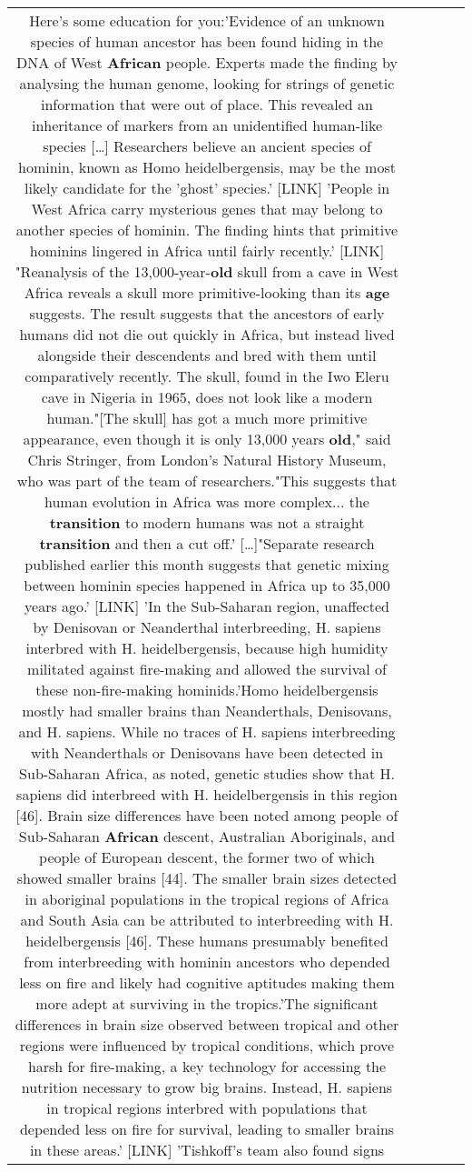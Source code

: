 \documentclass[11pt]{article}
\newlength\mylength
\begin{document}
\begin{center}
\begin{longtable}{|C{.65\mylength}|C{.30\mylength}|C{.12\mylength}|C{.12\mylength}|C{.12\mylength}|}
  \small Here's some education for you:'Evidence of an unknown species of human ancestor has been found hiding in the DNA of West \textbf{African} people. Experts made the finding by analysing the human genome, looking for strings of genetic information that were out of place. This revealed an inheritance of markers from an unidentified human-like species […] Researchers believe an ancient species of hominin, known as Homo heidelbergensis, may be the most likely candidate for the 'ghost' species.' [LINK] 'People in West Africa carry mysterious genes that may belong to another species of hominin. The finding hints that primitive hominins lingered in Africa until fairly recently.' [LINK] "Reanalysis of the 13,000-year-\textbf{old} skull from a cave in West Africa reveals a skull more primitive-looking than its \textbf{age} suggests. The result suggests that the ancestors of early humans did not die out quickly in Africa, but instead lived alongside their descendents and bred with them until comparatively recently. The skull, found in the Iwo Eleru cave in Nigeria in 1965, does not look like a modern human."[The skull] has got a much more primitive appearance, even though it is only 13,000 years \textbf{old}," said Chris Stringer, from London's Natural History Museum, who was part of the team of researchers."This suggests that human evolution in Africa was more complex... the \textbf{transition} to modern humans was not a straight \textbf{transition} and then a cut off.' […]"Separate research published earlier this month suggests that genetic mixing between hominin species happened in Africa up to 35,000 years ago.' [LINK] 'In the Sub-Saharan region, unaffected by Denisovan or Neanderthal interbreeding, H. sapiens interbred with H. heidelbergensis, because high humidity militated against fire-making and allowed the survival of these non-fire-making hominids.'Homo heidelbergensis mostly had smaller brains than Neanderthals, Denisovans, and H. sapiens. While no traces of H. sapiens interbreeding with Neanderthals or Denisovans have been detected in Sub-Saharan Africa, as noted, genetic studies show that H. sapiens did interbreed with H. heidelbergensis in this region [46]. Brain size differences have been noted among people of Sub-Saharan \textbf{African} descent, Australian Aboriginals, and people of European descent, the former two of which showed smaller brains [44]. The smaller brain sizes detected in aboriginal populations in the tropical regions of Africa and South Asia can be attributed to interbreeding with H. heidelbergensis [46]. These humans presumably benefited from interbreeding with hominin ancestors who depended less on fire and likely had cognitive aptitudes making them more adept at surviving in the tropics.'The significant differences in brain size observed between tropical and other regions were influenced by tropical conditions, which prove harsh for fire-making, a key technology for accessing the nutrition necessary to grow big brains. Instead, H. sapiens in tropical regions interbred with populations that depended less on fire for survival, leading to smaller brains in these areas.' [LINK] 'Tishkoff's team also found signs 
\end{longtable}
\end{center}
\end{document}
